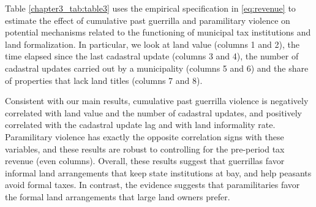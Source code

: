 Table \ref{chapter3_tab:table3} uses the empirical specification in \eqref{eq:revenue} to estimate the effect of cumulative past guerrilla and paramilitary violence on potential mechanisms related to the functioning of municipal tax institutions and land formalization. In particular, we look at land value (columns 1 and 2), the time elapsed since the last cadastral update (columns 3 and 4), the number of cadastral updates carried out by a municipality (columns 5 and 6) and the share of properties that lack land titles (columns 7 and 8). 


\begin{table}[htbp]
\def\sym#1{\ifmmode^{#1}\else\(^{#1}\)\fi}\caption{Mechanisms: Cumulative violence (1997-2002) and potential mechanisms (2003-2006)}
\label{chapter3_tab:table3}
\begin{center}
\end{center}
\end{table}

Consistent with our main results, cumulative past guerrilla violence is negatively correlated with land value and the number of cadastral updates, and positively correlated with the cadastral update lag and with land informality rate. Paramilitary violence has exactly the opposite correlation signs with these variables, and these results are robust to controlling for the pre-period tax revenue (even columns). Overall, these results suggest that guerrillas favor informal land arrangements that keep state institutions at bay, and help peasants avoid formal taxes. In contrast, the evidence suggests that paramilitaries favor the formal land arrangements that large land owners prefer. 
 
